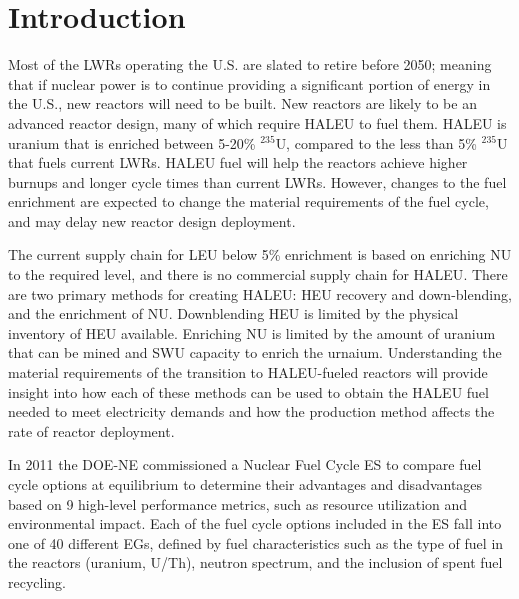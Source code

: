 \section{Introduction}

Most of the \glspl{LWR} operating the U.S. are slated to retire
before 2050; meaning that if nuclear power is to continue providing a 
significant portion of energy in the U.S., new reactors will need to be built. 
New reactors are likely to be an advanced reactor design, many of 
which require \gls{HALEU} to fuel them. \gls{HALEU} is uranium that 
is enriched between 5-20\% $^{235}$U, compared to the less than 5\% $^{235}$U 
that fuels current \glspl{LWR}. \gls{HALEU} fuel will help 
the reactors achieve higher burnups and longer cycle times than current 
\glspl{LWR}. However, changes to the fuel enrichment are 
expected 
to change the material requirements of the fuel cycle, and may delay 
new reactor design deployment.

The current supply chain for \gls{LEU} below 5\% enrichment is based on 
enriching \gls{NU} to the required level, and there is no commercial 
supply chain for \gls{HALEU}. There are
two primary methods for creating \gls{HALEU}: \gls{HEU} recovery and 
down-blending, 
and the enrichment of \gls{NU}. Downblending \gls{HEU} is 
limited by the physical inventory of \gls{HEU} available. 
Enriching \gls{NU} is limited by the amount of uranium that can be 
mined and \gls{SWU} capacity to enrich the urnaium. Understanding the 
material requirements of the transition to \gls{HALEU}-fueled 
reactors will provide insight into how each of these methods can be used 
to obtain the \gls{HALEU} fuel needed to meet electricity demands and 
how the production method affects the rate of reactor deployment.

In 2011 the \gls{DOE-NE} commissioned a Nuclear Fuel Cycle \gls{ES} 
\cite{wigeland_nuclear_2014} to compare fuel cycle options at equilibrium
to determine their advantages and disadvantages
based on 9 high-level performance metrics, such as resource utilization and 
environmental impact. Each of the fuel cycle options included in the 
\gls{ES} fall into one of 40 different \glspl{EG}, defined by fuel 
characteristics such as the type of fuel in the reactors (uranium, 
U/Th), neutron spectrum, and the inclusion of spent fuel recycling. 

